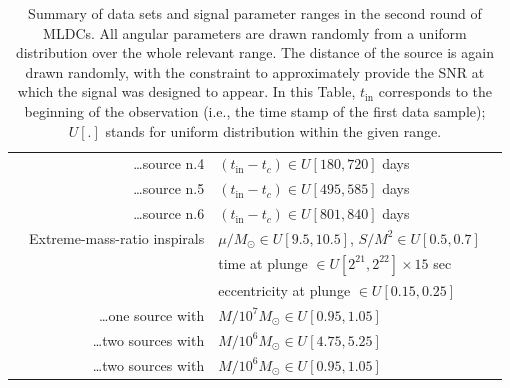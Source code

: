 \documentclass[12pt]{iopart}
\begin{document}
\begin{table}
\begin{tabular}{llll}
&\multicolumn{1}{r}{\ldots source n.4} &  $(t_\mathrm{in} - t_c) \in U[180,720]$ days\\
&\multicolumn{1}{r}{\ldots source n.5} &  $(t_\mathrm{in} - t_c) \in U[495,585]$ days\\
&\multicolumn{1}{r}{\ldots source n.6} &  $(t_\mathrm{in} - t_c) \in U[801,840]$ days\\
&Extreme-mass-ratio inspirals & $\mu/M_\odot \in U[9.5,10.5]$, $S/M^2 \in U[0.5, 0.7]$ \\
&                                             & time at plunge $\in  U[2^{21},2^{22}] \times 15$ sec \\
&                                             & eccentricity at plunge $\in U[0.15, 0.25]$ \\
&\multicolumn{1}{r}{\ldots one source with}          & $M / 10^7 M_\odot \in U[0.95,1.05]$ \\
&\multicolumn{1}{r}{\ldots two sources with}         & $M / 10^6 M_\odot \in U[4.75,5.25]$ \\
&\multicolumn{1}{r}{\ldots two sources with}         & $M / 10^6 M_\odot \in U[0.95,1.05]$ \\
\hline
\end{tabular}
\caption{Summary of data sets and signal parameter ranges in the second round of MLDCs. All angular parameters are drawn randomly from a uniform distribution over the whole relevant range. The distance of the source is again drawn randomly, with the constraint to approximately provide the SNR at which the signal was designed to appear. In this Table, $t_\mathrm{in}$ corresponds to the beginning of the observation (i.e., the time stamp of the first data sample); $U[.]$ stands for uniform distribution within the given range.}
\label{t:MLDC2}
\end{table}
\end{document}
